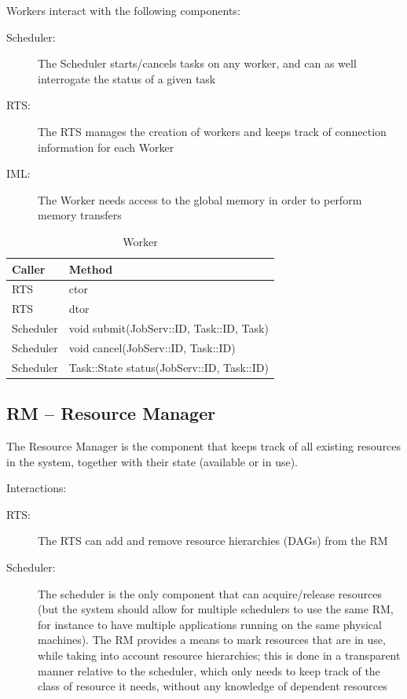 \documentclass[10pt]{article}
\newcommand{\rts}{RTS\xspace}
\newcommand{\sched}{Scheduler\xspace}
\newcommand{\worker}{Worker\xspace}
\newcommand{\workers}{Workers\xspace}
\newcommand{\rman}{RM\xspace}
\newcommand{\iml}{IML\xspace}
\newcommand{\js}{JobServ\xspace}
\newcommand{\task}{Task\xspace}
\newcommand{\id}{::ID\xspace}
\begin{document}
\workers interact with the following components:
\begin{description}
    \item [\sched:] The \sched starts/cancels tasks on any worker, and can as
    well interrogate the status of a given task
    \item [\rts:] The \rts manages the creation of workers and keeps track of
    connection information for each \worker
    \item [\iml:] The \worker needs access to the global memory in order to
    perform memory transfers
\end{description}

%
\begin{table}[ht]
    \centering
    \caption{Worker}
    \label{tab:worker}
    \bgroup
    \setlength{\tabcolsep}{2em}
    \begin{tabular}{ll}
        \toprule
        Caller & Method \\
        \midrule
        \rts & ctor \\
        \rts & dtor \\
        \sched & void submit(\js\id, \task\id, \task)  \\
        \sched & void cancel(\js\id, \task\id) \\
        \sched & \task::State status(\js\id, \task\id) \\
        \bottomrule
    \end{tabular}
    \egroup
\end{table}
%


\subsection{RM -- Resource Manager}

The Resource Manager is the component that keeps track of all existing resources in the system, together with their state (available or in use). 

Interactions:
\begin{description}
    \item [\rts:] The \rts can add and remove resource hierarchies (DAGs) from the \rman
    \item [\sched:] The scheduler is the only component that can acquire/release
    resources (but the system should allow for multiple schedulers to use the same
    \rman, for instance to have multiple applications running on the same physical
    machines). The \rman provides a means to mark resources that are in use, while
    taking into account resource hierarchies; this is done in a transparent manner
    relative to the scheduler, which only needs to keep track of the class of
    resource it needs, without any knowledge of dependent resources
\end{description}
\end{document}
